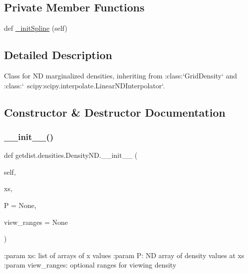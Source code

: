 \subsection*{Private Member Functions}
\begin{DoxyCompactItemize}
\item 
def \mbox{\hyperlink{classgetdist_1_1densities_1_1DensityND_a797109f7fd88118c7faa8157f5e71a70}{\+\_\+init\+Spline}} (self)
\end{DoxyCompactItemize}


\subsection{Detailed Description}
\begin{DoxyVerb}Class for ND marginalized densities, inheriting from :class:`GridDensity` and :class:`~scipy:scipy.interpolate.LinearNDInterpolator`.
\end{DoxyVerb}
 

\subsection{Constructor \& Destructor Documentation}
\mbox{\label{classgetdist_1_1densities_1_1DensityND_a0d9831e499b76b49e4c0770379266f62}} 
\subsubsection{\texorpdfstring{\+\_\+\+\_\+init\+\_\+\+\_\+()}{\_\_init\_\_()}}
{\footnotesize\ttfamily def getdist.\+densities.\+Density\+N\+D.\+\_\+\+\_\+init\+\_\+\+\_\+ (\begin{DoxyParamCaption}\item[{}]{self,  }\item[{}]{xs,  }\item[{}]{P = {\ttfamily None},  }\item[{}]{view\+\_\+ranges = {\ttfamily None} }\end{DoxyParamCaption})}

\begin{DoxyVerb}:param xs: list of arrays of x values        
:param P: ND array of density values at xs
:param view_ranges: optional ranges for viewing density
\end{DoxyVerb}
 

